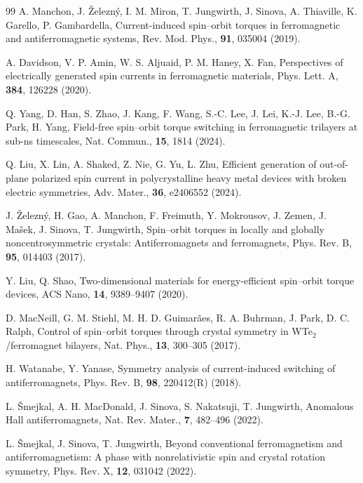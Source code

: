 \begin{thebibliography}{99}
A. Manchon, J. \v{Z}elezn\'y, I. M. Miron, T. Jungwirth, J. Sinova,
A. Thiaville, K. Garello, P. Gambardella,
Current-induced spin--orbit torques in ferromagnetic and antiferromagnetic
systems,
Rev. Mod. Phys., \textbf{91}, 035004 (2019).

A. Davidson, V. P. Amin, W. S. Aljuaid, P. M. Haney, X. Fan,
Perspectives of electrically generated spin currents in ferromagnetic
materials,
Phys. Lett. A, \textbf{384}, 126228 (2020).

Q. Yang, D. Han, S. Zhao, J. Kang, F. Wang, S.-C. Lee, J. Lei,
K.-J. Lee, B.-G. Park, H. Yang,
Field-free spin--orbit torque switching in ferromagnetic trilayers at sub-ns
timescales,
Nat. Commun., \textbf{15}, 1814 (2024).

Q. Liu, X. Lin, A. Shaked, Z. Nie, G. Yu, L. Zhu,
Efficient generation of out-of-plane polarized spin current in polycrystalline
heavy metal devices with broken electric symmetries,
Adv. Mater., \textbf{36}, e2406552 (2024).

J. \v{Z}elezn\'y, H. Gao, A. Manchon, F. Freimuth, Y. Mokrousov, J. Zemen,
J. Ma\v{s}ek, J. Sinova, T. Jungwirth,
Spin--orbit torques in locally and globally noncentrosymmetric crystals:
Antiferromagnets and ferromagnets,
Phys. Rev. B, \textbf{95}, 014403 (2017).

Y. Liu, Q. Shao,
Two-dimensional materials for energy-efficient spin--orbit torque devices,
ACS Nano, \textbf{14}, 9389--9407 (2020).

D. MacNeill, G. M. Stiehl, M. H. D. Guimar\~aes, R. A. Buhrman, J. Park,
D. C. Ralph,
Control of spin--orbit torques through crystal symmetry in
WTe$_2$/ferromagnet bilayers,
Nat. Phys., \textbf{13}, 300--305 (2017).

H. Watanabe, Y. Yanase,
Symmetry analysis of current-induced switching of antiferromagnets,
Phys. Rev. B, \textbf{98}, 220412(R) (2018).

L. \v{S}mejkal, A. H. MacDonald, J. Sinova, S. Nakatsuji, T. Jungwirth,
Anomalous Hall antiferromagnets,
Nat. Rev. Mater., \textbf{7}, 482--496 (2022).

L. \v{S}mejkal, J. Sinova, T. Jungwirth,
Beyond conventional ferromagnetism and antiferromagnetism: A phase with
nonrelativistic spin and crystal rotation symmetry,
Phys. Rev. X, \textbf{12}, 031042 (2022).


\end{thebibliography}
